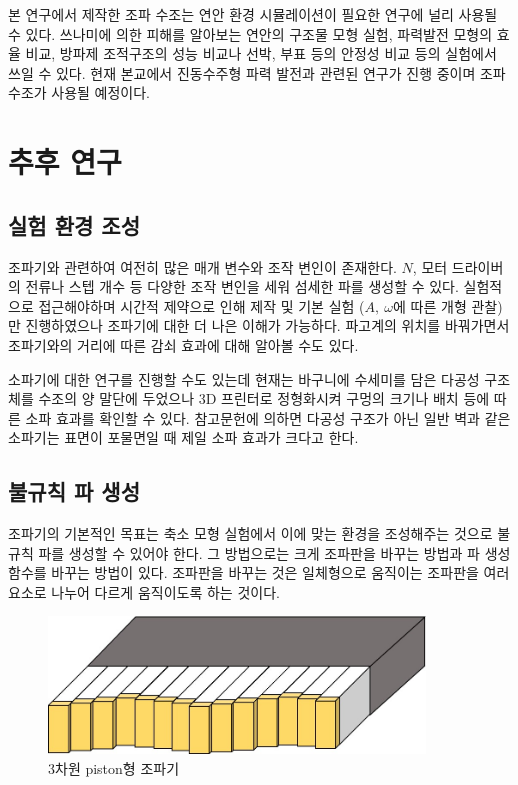 본 연구에서 제작한 조파 수조는 연안 환경 시뮬레이션이 필요한 연구에 널리 사용될 수 있다. 쓰나미에 의한 피해를 알아보는 연안의 구조물 모형 실험, 파력발전 모형의 효율 비교, 방파제 조적구조의 성능 비교나 선박, 부표 등의 안정성 비교 등의 실험에서 쓰일 수 있다. 현재 본교에서 진동수주형 파력 발전과 관련된 연구가 진행 중이며 조파 수조가 사용될 예정이다.

\section{추후 연구}

\subsection{실험 환경 조성}
조파기와 관련하여 여전히 많은 매개 변수와 조작 변인이 존재한다. $N$, 모터 드라이버의 전류나 스텝 개수 등 다양한 조작 변인을 세워 섬세한 파를 생성할 수 있다. 실험적으로 접근해야하며 시간적 제약으로 인해 제작 및 기본 실험 ($A,~\omega$에 따른 개형 관찰)만 진행하였으나 조파기에 대한 더 나은 이해가 가능하다. 파고계의 위치를 바꿔가면서 조파기와의 거리에 따른 감쇠 효과에 대해 알아볼 수도 있다.

소파기에 대한 연구를 진행할 수도 있는데 현재는 바구니에 수세미를 담은 다공성 구조체를 수조의 양 말단에 두었으나 3D 프린터로 정형화시켜 구멍의 크기나 배치 등에 따른 소파 효과를 확인할 수 있다. 참고문헌에 의하면 다공성 구조가 아닌 일반 벽과 같은 소파기는 표면이 포물면일 때 제일 소파 효과가 크다고 한다.

\subsection{불규칙 파 생성}
조파기의 기본적인 목표는 축소 모형 실험에서 이에 맞는 환경을 조성해주는 것으로 불규칙 파를 생성할 수 있어야 한다. 그 방법으로는 크게 조파판을 바꾸는 방법과 파 생성함수를 바꾸는 방법이 있다. 조파판을 바꾸는 것은 일체형으로 움직이는 조파판을 여러 요소로 나누어 다르게 움직이도록 하는 것이다.

\begin{figure}[htbp]
    \centering
    \includegraphics[width=10cm]{images/Wave_Maker(Snake).jpg}
    \caption{3차원 piston형 조파기}
    \label{Snake Wave Maker}
\end{figure}

